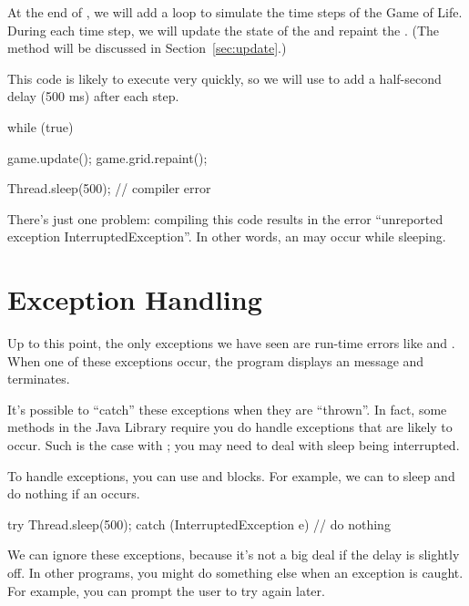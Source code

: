 At the end of , we will add a  loop to simulate the time steps of the Game of Life.
During each time step, we will update the state of the  and repaint the .
(The  method will be discussed in Section~\ref{sec:update}.)

This code is likely to execute very quickly, so we will use  to add a half-second delay (500 ms) after each step.


\begin{code}
while (true) {
    game.update();
    game.grid.repaint();
    
    Thread.sleep(500);    // compiler error
}
\end{code}


There's just one problem: compiling this code results in the error ``unreported exception InterruptedException''.
In other words, an  may occur while sleeping.


\section{Exception Handling}

Up to this point, the only exceptions we have seen are run-time errors like  and .
When one of these exceptions occur, the program displays an message and terminates.

It's possible to ``catch'' these exceptions when they are ``thrown''.
In fact, some methods in the Java Library require you do handle exceptions that are likely to occur.
Such is the case with ; you may need to deal with sleep being interrupted.


To handle exceptions, you can use  and  blocks.
For example, we can  to sleep and do nothing if an  occurs.

\begin{code}
try {
    Thread.sleep(500);
} catch (InterruptedException e) {
    // do nothing
}
\end{code}

We can ignore these exceptions, because it's not a big deal if the delay is slightly off.
In other programs, you might do something else when an exception is caught.
For example, you can prompt the user to try again later.


